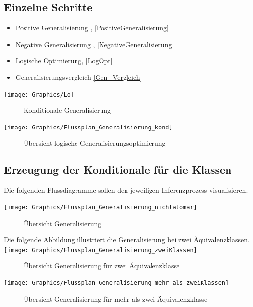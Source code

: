 \documentclass[draft]{scrreprt}
\begin{document}
\subsection{Einzelne Schritte}
\begin{itemize}
	\item Positive Generalisierung , \ref{PositiveGeneralisierung}
	\item Negative Generalisierung , \ref{NegativeGeneralisierung}
	\item Logische Optimierung, \ref{LogOpt}
	\item Generalisierungsvergleich \ref{Gen_Vergleich}
\end{itemize}

\texttt{[image: Graphics/Lo]}
\begin{figure}[h]
	\caption{Konditionale Generalisierung }
	\label{Abb_Log_Gen}
\end{figure}


\texttt{[image: Graphics/Flussplan\_Generalisierung\_kond]}
\begin{figure}[h]
	\caption{Übersicht logische Generalisierungsoptimierung}
	\label{Fig_Log_Genopt}
\end{figure}


\subsection{Erzeugung der Konditionale für die Klassen}
Die folgenden Flussdiagramme sollen den jeweiligen Inferenzprozess visualisieren.

\texttt{[image: Graphics/Flussplan\_Generalisierung\_nichtatomar]}
\begin{figure}[h]
	\caption{Übersicht Generalisierung}
	\label{Fig_General}
\end{figure}
\newpage
Die folgende Abbildung illustriert die Generalisierung bei zwei Äquivalenzklassen.
\texttt{[image: Graphics/Flussplan\_Generalisierung\_zweiKlassen]}
\begin{figure}[h]
	\caption{Übersicht Generalisierung für zwei Äquivalenzklasse}
	\label{Fig_ZweiKlassen}
\end{figure}

\texttt{[image: Graphics/Flussplan\_Generalisierung\_mehr\_als\_zweiKlassen]}
\begin{figure}[h]
	\caption{Übersicht Generalisierung für mehr als zwei Äquivalenzklasse}
	\label{Fig_Mehr_Klassen}
\end{figure}
\end{document}
